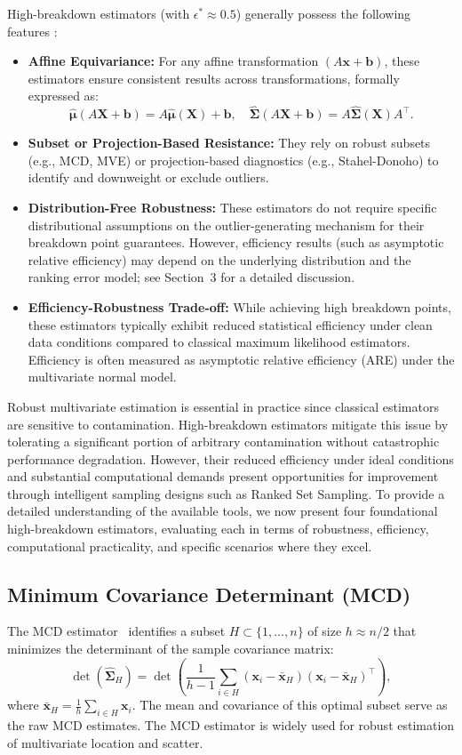 \documentclass[12pt]{article}
\begin{document}
High-breakdown estimators (with $\epsilon^* \approx 0.5$)
generally possess the following features \cite{maronna2019robust}:
\begin{itemize}
    \item \textbf{Affine Equivariance:} For any affine transformation $(A \mathbf{x} + \mathbf{b})$, these estimators ensure consistent results across transformations, formally expressed as:
    \[
    \hat{\bm{\mu}}(A\mathbf{X} + \mathbf{b}) = A\hat{\bm{\mu}}(\mathbf{X}) + \mathbf{b}, \quad \hat{\bm{\Sigma}}(A\mathbf{X} + \mathbf{b}) = A\hat{\bm{\Sigma}}(\mathbf{X})A^\top.
    \]
    \item \textbf{Subset or Projection-Based Resistance:} They rely on robust subsets (e.g., MCD, MVE) or projection-based diagnostics (e.g., Stahel-Donoho) to identify and downweight or exclude outliers.
    \item \textbf{Distribution-Free Robustness:} These estimators do not require specific distributional assumptions on the outlier-generating mechanism for their breakdown point guarantees. However, efficiency results (such as asymptotic relative efficiency) may depend on the underlying distribution and the ranking error model; see Section~3 for a detailed discussion.
    \item \textbf{Efficiency-Robustness Trade-off:} While achieving high breakdown points, these estimators typically exhibit reduced statistical efficiency under clean data conditions compared to classical maximum likelihood estimators. Efficiency is often measured as asymptotic relative efficiency (ARE) under the multivariate normal model.
\end{itemize}

Robust multivariate estimation is essential in practice since classical estimators are sensitive to contamination. High-breakdown estimators mitigate this issue by tolerating a significant portion of arbitrary contamination without catastrophic performance degradation. However, their reduced efficiency under ideal conditions and substantial computational demands present opportunities for improvement through intelligent sampling designs such as Ranked Set Sampling. To provide a detailed understanding of the available tools, we now present four foundational high-breakdown estimators, evaluating each in terms of robustness, efficiency, computational practicality, and specific scenarios where they excel.

\subsection{Minimum Covariance Determinant (MCD)}
The MCD estimator~\cite{rousseeuw1999fast} identifies a subset $H \subset \{1, \ldots, n\}$ of size $h \approx n/2$ that minimizes the determinant of the sample covariance matrix:
\[
\det(\hat{\bm{\Sigma}}_H) = \det\left( \frac{1}{h - 1} \sum_{i \in H} (\mathbf{x}_i - \bar{\mathbf{x}}_H)(\mathbf{x}_i - \bar{\mathbf{x}}_H)^\top \right),
\]
where $\bar{\mathbf{x}}_H = \frac{1}{h} \sum_{i \in H} \mathbf{x}_i$. The mean and covariance of this optimal subset serve as the raw MCD estimates. The MCD estimator is widely used for robust estimation of multivariate location and scatter.
\end{document}
